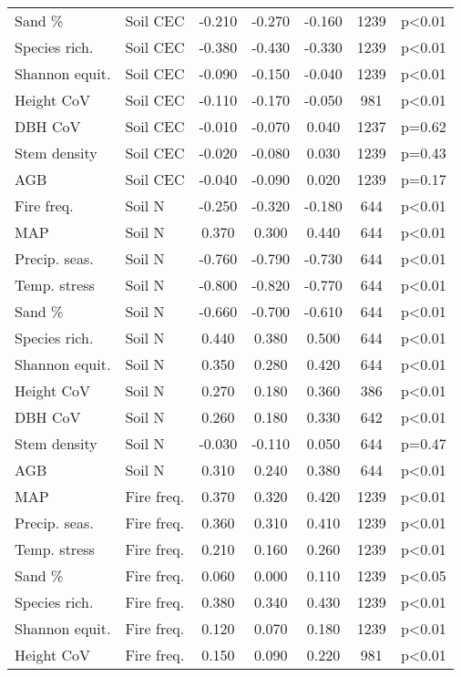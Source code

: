 \begin{longtable}{llSSSS[table-format=3.2,table-column-width=0.8cm]c}
Sand \% & Soil CEC & -0.210 & -0.270 & -0.160 & 1239 & p<0.01 \\ 
Species rich. & Soil CEC & -0.380 & -0.430 & -0.330 & 1239 & p<0.01 \\ 
Shannon equit. & Soil CEC & -0.090 & -0.150 & -0.040 & 1239 & p<0.01 \\ 
Height CoV & Soil CEC & -0.110 & -0.170 & -0.050 & 981 & p<0.01 \\ 
DBH CoV & Soil CEC & -0.010 & -0.070 & 0.040 & 1237 & p=0.62 \\ 
Stem density & Soil CEC & -0.020 & -0.080 & 0.030 & 1239 & p=0.43 \\ 
AGB & Soil CEC & -0.040 & -0.090 & 0.020 & 1239 & p=0.17 \\ 
Fire freq. & Soil N & -0.250 & -0.320 & -0.180 & 644 & p<0.01 \\ 
MAP & Soil N & 0.370 & 0.300 & 0.440 & 644 & p<0.01 \\ 
Precip. seas. & Soil N & -0.760 & -0.790 & -0.730 & 644 & p<0.01 \\ 
Temp. stress & Soil N & -0.800 & -0.820 & -0.770 & 644 & p<0.01 \\ 
Sand \% & Soil N & -0.660 & -0.700 & -0.610 & 644 & p<0.01 \\ 
Species rich. & Soil N & 0.440 & 0.380 & 0.500 & 644 & p<0.01 \\ 
Shannon equit. & Soil N & 0.350 & 0.280 & 0.420 & 644 & p<0.01 \\ 
Height CoV & Soil N & 0.270 & 0.180 & 0.360 & 386 & p<0.01 \\ 
DBH CoV & Soil N & 0.260 & 0.180 & 0.330 & 642 & p<0.01 \\ 
Stem density & Soil N & -0.030 & -0.110 & 0.050 & 644 & p=0.47 \\ 
AGB & Soil N & 0.310 & 0.240 & 0.380 & 644 & p<0.01 \\ 
MAP & Fire freq. & 0.370 & 0.320 & 0.420 & 1239 & p<0.01 \\ 
Precip. seas. & Fire freq. & 0.360 & 0.310 & 0.410 & 1239 & p<0.01 \\ 
Temp. stress & Fire freq. & 0.210 & 0.160 & 0.260 & 1239 & p<0.01 \\ 
Sand \% & Fire freq. & 0.060 & 0.000 & 0.110 & 1239 & p<0.05 \\ 
Species rich. & Fire freq. & 0.380 & 0.340 & 0.430 & 1239 & p<0.01 \\ 
Shannon equit. & Fire freq. & 0.120 & 0.070 & 0.180 & 1239 & p<0.01 \\ 
Height CoV & Fire freq. & 0.150 & 0.090 & 0.220 & 981 & p<0.01 \\ 

\end{longtable}
